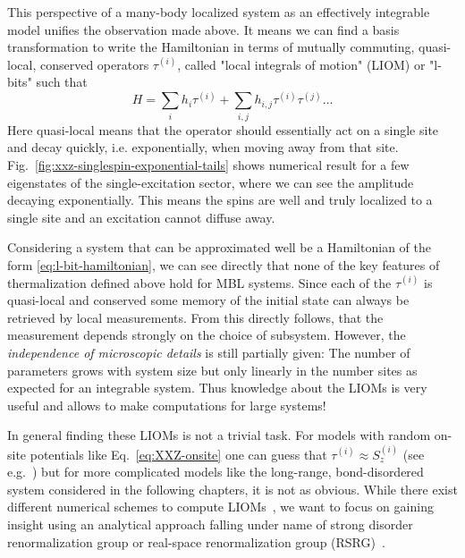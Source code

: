 This perspective of a many-body localized system as an effectively integrable model unifies the observation made above. It means we can find a basis transformation to write the Hamiltonian in terms of mutually commuting, quasi-local, conserved operators $\tau^{(i)}$, called "local integrals of motion" (LIOM) or "l-bits" such that~\cite{serbynLocalConservationLaws2013,swingleSimpleModelManybody2013,husePhenomenologyFullyManybodylocalized2014}
\begin{equation}\label{eq:l-bit-hamiltonian}
	H = \sum_i h_i \tau^{(i)} + \sum_{i,j} h_{i,j} \tau^{(i)}\tau^{(j)} \ldots
\end{equation}
Here quasi-local means that the operator should essentially act on a single site and decay quickly, i.e. exponentially, when moving away from that site. Fig.~\ref{fig:xxz-singlespin-exponential-tails} shows numerical result for a few eigenstates of the single-excitation sector, where we can see the amplitude decaying exponentially. This means the spins are well and truly localized to a single site and an excitation cannot diffuse away.

Considering a system that can be approximated well be a Hamiltonian of the form \ref{eq:l-bit-hamiltonian}, we can see directly that none of the key features of thermalization defined above hold for MBL systems. Since each of the $\tau^{(i)}$ is quasi-local and conserved some memory of the initial state can always be retrieved by local measurements. From this directly follows, that the measurement depends strongly on the choice of subsystem. However, the \emph{independence of microscopic details} is still partially given: The number of parameters grows with system size but only linearly in the number sites as expected for an integrable system. Thus knowledge about the LIOMs is very useful and allows to make computations for large systems!

In general finding these LIOMs is not a trivial task. For models with random on-site potentials like Eq.~\ref{eq:XXZ-onsite} one can guess that $\tau^{(i)}\approx S_z^{(i)}$ (see e.g.~\cite{adamiStructuralPropertiesLocal2022}) but for more complicated models like the long-range, bond-disordered system considered in the following chapters, it is not as obvious. While there exist different numerical schemes to compute LIOMs~\cite{chandranConstructingLocalIntegrals2015,mierzejewskiIdentifyingLocalQuasilocal2015,mierzejewskiApproximateConservationLaws2015,thomsonLocalIntegralsMotion2021,adamiStructuralPropertiesLocal2022}, we want to focus on gaining insight using an analytical approach falling under name of strong disorder renormalization group or real-space renormalization group (RSRG)~\cite{dasguptaLowtemperaturePropertiesRandom1980,fisherRandomAntiferromagneticQuantum1994,igloiStrongDisorderRG2005,voskManybodyLocalizationOne2013,voskTheoryManyBodyLocalization2015,igloiStrongDisorderRG2018}.

